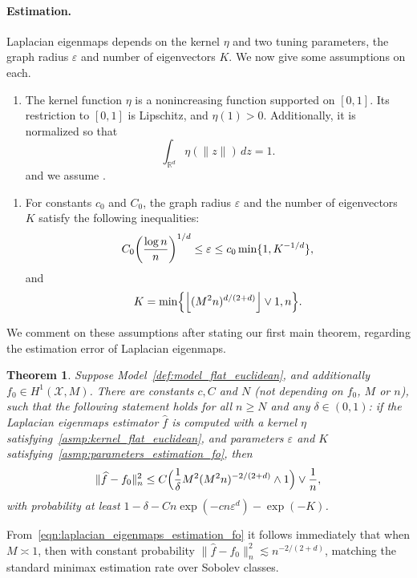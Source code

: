 \documentclass{article}
\newcommand{\Reals}{\mathbb{R}}
\newcommand{\floor}[1]{\left\lfloor #1 \right\rfloor}
\newcommand{\1}{\mathbf{1}}
\newcommand{\Rd}{\Reals^d}
\newcommand{\mc}[1]{\mathcal{#1}}
\newcommand{\wh}[1]{\widehat{#1}}
\theoremstyle{alden}
\theoremstyle{aldenthm}
\newtheorem{theorem}{Theorem}
\theoremstyle{definition}
\theoremstyle{remark}
\begin{document}
\paragraph{Estimation.} Laplacian eigenmaps depends on the kernel $\eta$ and two tuning parameters, the graph radius $\varepsilon$ and number of eigenvectors $K$. We now give some assumptions on each.
\begin{enumerate}[label=(K\arabic*)]
	\setcounter{enumi}{0}
	\item
	\label{asmp:kernel_flat_euclidean}
	The kernel function $\eta$ is a nonincreasing function supported on $[0,1]$. Its restriction to $[0,1]$ is Lipschitz, and $\eta(1) > 0$. Additionally, it is normalized so that
	\begin{equation*}
	\int_{\Rd} \eta(\|z\|) \,dz = 1.
	\end{equation*}
	and we assume \smash{$\sigma_{\eta} := \frac{1}{d}\int_{\Rd} \|x\|^2 \eta(\|x\|) \,dx < \infty$}.
\end{enumerate}
\begin{enumerate}[label=(P\arabic*)]
	\setcounter{enumi}{0}
	\item 
	\label{asmp:parameters_estimation_fo} 
	For constants $c_0$ and $C_0$, the graph radius $\varepsilon$ and the number of eigenvectors $K$ satisfy the following inequalities:
	\begin{equation}\\
	\label{eqn:radius_fo} 
	C_0\biggl(\frac{\log n}{n}\biggr)^{1/d} \leq \varepsilon \leq c_0\min\{1,K^{-1/d}\},
	\end{equation}
	and 
	\begin{equation}
	\label{eqn:eigenvector_estimation_fo} 
	K = \min\Bigl\{\floor{(M^2n)^{d/(2 + d)}} \vee 1, n\Bigr\}.
	\end{equation}
\end{enumerate}
We comment on these assumptions after stating our first main theorem, regarding the estimation error of Laplacian eigenmaps.
\begin{theorem}
	\label{thm:laplacian_eigenmaps_estimation_fo}
	Suppose Model~\ref{def:model_flat_euclidean}, and additionally $f_0 \in H^1(\mc{X},M)$. There are constants $c,C$ and $N$ (not depending on $f_0$, $M$ or $n$), such that the following statement holds for all $n \geq N$ and any $\delta \in (0,1)$: if the Laplacian eigenmaps estimator $\wh{f}$ is computed with a kernel $\eta$ satisfying~\ref{asmp:kernel_flat_euclidean}, and parameters $\varepsilon$ and $K$ satisfying~\ref{asmp:parameters_estimation_fo}, then
	\begin{equation}
	\label{eqn:laplacian_eigenmaps_estimation_fo}
	\|\wh{f} - f_0\|_n^2 \leq C\Bigl(\frac{1}{\delta}M^2(M^2n)^{-2/(2 + d)} \wedge 1\Bigr) \vee \frac{1}{n},
	\end{equation}
	with probability at least $1 - \delta - Cn\exp(-cn\varepsilon^d) - \exp(-K)$.
\end{theorem}
From~\eqref{eqn:laplacian_eigenmaps_estimation_fo} it follows immediately that when $M \asymp 1$, then with constant probability $\|\wh{f} - f_0\|_n^2 \lesssim n^{-2/(2 + d)}$, matching the standard minimax estimation rate over Sobolev classes.
\end{document}
